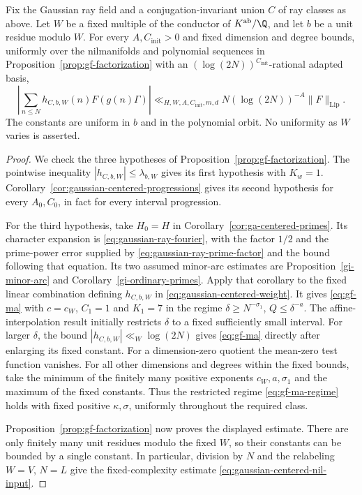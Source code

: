 \begin{corollary}
\label{cor:ga-fixed-centered-nilsequence}
Fix the Gaussian ray field and a conjugation-invariant union $C$ of ray
classes as above. Let $W$ be a fixed multiple of the conductor of
$K^{\mathrm{ab}}/\Q$, and let $b$ be a unit residue modulo $W$.
For every $A,C_{\mathrm{init}}>0$ and fixed dimension and degree bounds,
uniformly over the nilmanifolds and polynomial sequences in
Proposition~\ref{prop:gf-factorization} with an
$(\log(2N))^{C_{\mathrm{init}}}$-rational adapted basis,
\[
 \left|\sum_{n\leq N}h_{C,b,W}(n)F(g(n)\Gamma)\right|
 \ll_{H,W,A,C_{\mathrm{init}},m,d}
 N(\log(2N))^{-A}\|F\|_{\mathrm{Lip}}.
\]
The constants are uniform in $b$ and in the polynomial orbit. No
uniformity as $W$ varies is asserted.
\end{corollary}
\begin{proof}
We check the three hypotheses of
Proposition~\ref{prop:gf-factorization}. The pointwise inequality
$|h_{C,b,W}|\leq\lambda_{b,W}$ gives its first hypothesis with $K_w=1$.
Corollary~\ref{cor:gaussian-centered-progressions} gives its second
hypothesis for every $A_0,C_0$, in fact for every interval progression.

For the third hypothesis, take $H_0=H$ in
Corollary~\ref{cor:ga-centered-primes}. Its character expansion is
\eqref{eq:gaussian-ray-fourier}, with the factor $1/2$ and the
prime-power error supplied by \eqref{eq:gaussian-ray-prime-factor}
and the bound following that equation. Its two assumed minor-arc
estimates are Proposition~\ref{gi-minor-arc} and
Corollary~\ref{gi-ordinary-primes}. Apply that corollary to the fixed
linear combination defining $h_{C,b,W}$ in
\eqref{eq:gaussian-centered-weight}. It gives \eqref{eq:gf-ma} with
$c=c_W$, $C_1=1$ and $K_1=7$ in the regime
$\delta\geq N^{-\sigma_1}$, $Q\leq\delta^{-a}$.
The affine-interpolation result initially restricts $\delta$ to a
fixed sufficiently small interval. For larger $\delta$, the bound
$|h_{C,b,W}|\ll_W\log(2N)$ gives \eqref{eq:gf-ma} directly after
enlarging its fixed constant. For a dimension-zero quotient the
mean-zero test function vanishes. For all other dimensions and degrees
within the fixed bounds, take the minimum of the finitely many positive
exponents $c_W,a,\sigma_1$ and the maximum of the fixed constants.
Thus the restricted regime \eqref{eq:gf-ma-regime} holds with fixed
positive $\kappa,\sigma$, uniformly throughout the required class.

Proposition~\ref{prop:gf-factorization} now proves the displayed
estimate. There are only finitely many unit residues modulo the fixed
$W$, so their constants can be bounded by a single constant. In
particular, division by $N$ and the relabeling $W=V$, $N=L$ give the
fixed-complexity estimate \eqref{eq:gaussian-centered-nil-input}.
\end{proof}


